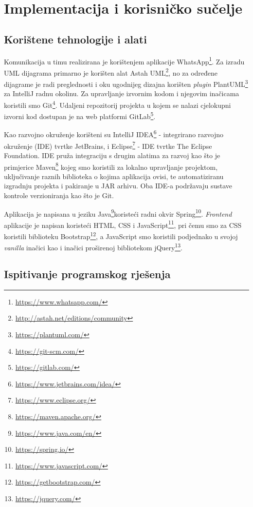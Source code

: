 \chapter{Implementacija i korisničko sučelje}
		
		
		\section{Korištene tehnologije i alati}
			
		Komunikacija u timu realizirana je korištenjem aplikacije WhatsApp\footnote{\url{https://www.whatsapp.com/}}. Za izradu UML dijagrama primarno je korišten alat Astah UML\footnote{\url{http://astah.net/editions/community}}, no za određene dijagrame je radi preglednosti i oku ugodnijeg dizajna korišten \textit{plugin} PlantUML\footnote{\url{https://plantuml.com/}} za IntelliJ radnu okolinu. Za upravljanje izvornim kodom i njegovim inačicama koristili smo Git\footnote{\url{https://git-scm.com/}}. Udaljeni repozitorij projekta u kojem se nalazi cjelokupni izvorni kod dostupan je na web platformi GitLab\footnote{\url{https://gitlab.com/}}.
			
				Kao razvojno okruženje korišteni su IntelliJ IDEA\footnote{\url{https://www.jetbrains.com/idea/}} - integrirano razvojno okruženje (IDE) tvrtke JetBrains, i Eclipse\footnote{\url{https://www.eclipse.org/}} - IDE tvrtke The Eclipse Foundation. IDE pruža integraciju s drugim alatima za razvoj kao što je primjerice Maven\footnote{\url{https://maven.apache.org/}} kojeg smo koristili za lokalno upravljanje projektom, uključivanje raznih biblioteka o kojima aplikacija ovisi, te automatiziranu izgradnju projekta i pakiranje u JAR arhivu. Oba IDE-a podržavaju sustave kontrole verzioniranja kao što je Git.
				
				Aplikacija je napisana u jeziku Java\footnote{\url{https://www.java.com/en/}}koristeći radni okvir Spring\footnote{\url{https://spring.io/}}. \textit{Frontend} aplikacije je napisan koristeći HTML, CSS i JavaScript\footnote{\url{https://www.javascript.com/}}, pri čemu smo za CSS koristili biblioteku Bootstrap\footnote{\url{https://getbootstrap.com/}}, a JavaScript smo koristili podjednako u svojoj \textit{vanilla} inačici kao i inačici proširenoj bibliotekom jQuery\footnote{\url{https://jquery.com/}}.
 			
			\eject 
			
		\section{Ispitivanje programskog rješenja}
			
